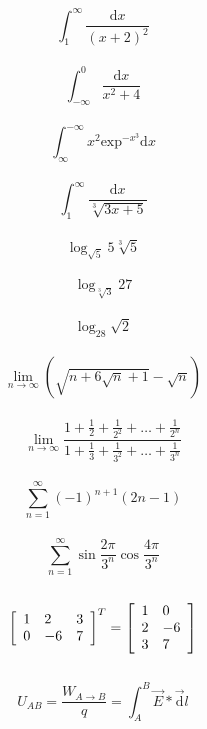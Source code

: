 \documentclass[12pt, letterpaper]{article}
\begin{document}
$$
\int_{1}^\infty \frac{\mathrm{d} x}{(x+2)^2}
$$\\

$$
\int_{-\infty}^0 \frac{\mathrm{d} x}{x^2 + 4}
$$\\

$$
\int_{\infty}^{-\infty} x^2 \mathrm{exp}^{-x^3} \mathrm{d} x
$$\\

$$
\int_1^\infty \frac{\mathrm{d} x}{\sqrt[3]{3x+5}}
$$\\

$$
\log_{\sqrt{5}}5\sqrt[3]{5}
$$\\

$$
\log_{\sqrt[3]{3}}27
$$\\

$$
\log_28\sqrt{2}
$$\\

$$
\lim_{n\to\infty}\left(\sqrt{n+6\sqrt{n} + 1} - \sqrt{n} \right)
$$\\

$$
\lim_{n\to\infty} \frac{1 + \frac{1}{2} + \frac{1}{2^2} + \ldots + \frac{1}{2^n}}{1 + \frac{1}{3} + \frac{1}{3^2} + \ldots + \frac{1}{3^n}}
$$\\

$$
\sum_{n=1}^\infty(-1)^{n+1}(2n - 1)
$$\\

$$
\sum_{n=1}^\infty \sin\frac{2\pi}{3^n}\cos\frac{4\pi}{3^n}
$$\\

$$
\left[\begin{array}{l l l}
1 & 2 & 3 \\
0 & -6 & 7 
\end{array}\right]
^T
=
\left[\begin{array}{l l}
1 & 0 \\
2 & -6 \\
3 & 7 
\end{array}\right]
$$\\

$$
U_{AB} = \frac{W_{A \rightarrow B}}{q} = \int_A^B \vec{E} * \vec{\mathrm{d}}l
$$\\
\end{document}
